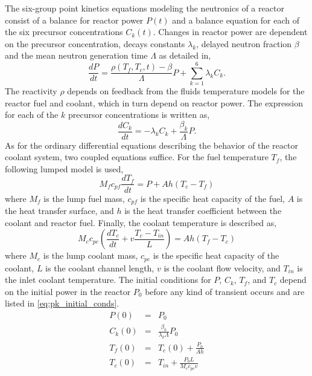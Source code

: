 The six-group point kinetics equations modeling the neutronics of a reactor consist of a balance for reactor power $P(t)$ and a balance equation for each of the six precursor concentrations $C_k(t)$. Changes in reactor power are dependent on the precursor concentration, decays constants $\lambda_k$, delayed neutron fraction $\beta$ and the mean neutron generation time $\Lambda$ as detailed in,
\begin{equation}
\label{eq:pk_power}
   \frac{dP}{dt} = \frac{\rho(T_f,T_c,t)-\beta}{\Lambda}P +
    \sum_{k=1}^6 \lambda_k C_k.
\end{equation}  
The reactivity $\rho$ depends on feedback from the fluids temperature models for the reactor fuel and coolant, which in turn depend on reactor power. The expression for each of the $k$ precursor concentrations is written as,
\begin{equation}
\label{eq:pk_precursors}
   \frac{dC_k}{dt} = -\lambda_k C_k +
    \frac{\beta_k}{\Lambda}P.
\end{equation}
As for the ordinary differential equations describing the behavior of the reactor coolant system, two coupled equations suffice. For the fuel temperature $T_f$, the following lumped model is used,
\begin{equation}
\label{eq:pk_fuel}
   M_f c_{pf}\frac{dT_f}{dt} = P + Ah(T_c-T_f)
\end{equation}
where $M_f$ is the lump fuel mass, $c_{pf}$ is the specific heat capacity of the fuel, $A$ is the heat transfer surface, and $h$ is the heat transfer coefficient between the coolant and reactor fuel. Finally, the coolant temperature is described as,
\begin{equation}
\label{eq:pk_coolant}
   M_c c_{pc}\left(\frac{dT_c}{dt} +v \frac{T_c - T_{in}}{L}\right) = 
    Ah(T_f-T_c)
\end{equation}
where $M_c$ is the lump coolant mass, $c_{pc}$ is the specific heat capacity of the coolant, $L$ is the coolant channel length, $v$ is the coolant flow velocity, and $T_{in}$ is the inlet coolant temperature. The initial conditions for $P$, $C_k$, $T_f$, and $T_c$ depend on the initial power in the reactor $P_0$ before any kind of transient occurs and are listed in \ref{eq:pk_initial_conds}. 
\begin{eqnarray}
\label{eq:pk_initial_conds}
   P(0) &=& P_0 \\ 
   C_k(0) &=& \frac{\beta_k}{\lambda_k\Lambda}P_0 \nonumber \\
   T_f(0) &=& T_c(0) + \frac{P_0}{Ah} \nonumber \\
   T_c(0) &=& T_{in} + \frac{P_0L}{M_c c_{pc}v} \nonumber
\end{eqnarray}
